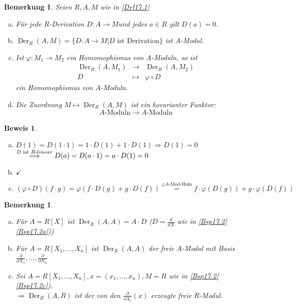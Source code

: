 \documentclass[a4paper,12pt]{report}
\theoremstyle{break}
\newtheorem{Bem}[Def]{Bemerkung}
\theoremstyle{nonumberbreak}
\newtheorem{Bew}{Beweis}
\theoremstyle{nonumberplain}
\DeclareMathOperator{\Der}{Der}
\begin{document}
\begin{Bem}\label{Bem17.3}Seien $R,A,M$ wie in \ref{Def17.1}\begin{enumerate}[a)]
\item
	F\"ur jede $R$-Derivation $D:A\to M$und jedes $a\in R$ gilt $D(a)=0$.
\item
	$\Der_R(A,M)=\{D:A\to M| D \text{ ist Derivation}\}$ ist $A$-Modul.
\item\label{Bem17.3c}
	Ist $\varphi:M_1\to M_2$ ein Homomophismus von $A$-Moduln, so ist \[\begin{array}{rcl}\Der_R(A,M_1)&\to&\Der_R(A,M_2)\\D&\mapsto&\varphi\circ D\end{array}\] ein Homomophismus von $A$-Moduln.
\item
	Die Zuordnung $M\mapsto\Der_R(A,M)$ ist ein kovarianter Funktor:
		\[ \underline{A\text{-Moduln}} \to \underline{A\text{-Moduln}} \]
\end{enumerate}\end{Bem}

\begin{Bew}\begin{enumerate}[a)]
\item
	$D(1)=D(1\cdot1)=1\cdot D(1) + 1\cdot D(1) \Rightarrow D(1)=0$\\
	$\overset{D\text{ ist }R\text-linear}{\Longrightarrow }D(a)=D(a\cdot 1)=a\cdot D(1)=0$
\item
	$\checkmark$
\item
	$(\varphi\circ D)(f\cdot g)=\varphi(f\cdot D(g)+g\cdot D(f))\overset{\varphi A\text{-Mod-Hom}}{=} f\cdot \varphi(D(g))+ g\cdot\varphi(D(f))$
\end{enumerate}\end{Bew}

\begin{Bem}\label{bem17.4}\begin{enumerate}[a)]
\item
	F\"ur $A=R[X]$ ist $\Der_R(A,A)=A\cdot D$ ($D=\frac{d}{dX}$ wie in \ref{Bsp17.2} \ref{Bsp17.2a}))
\item
	F\"ur $A=R[X_1,\ldots ,X_n]$ ist $\Der_R(A,A)$ der freie $A$-Modul mit Basis $\frac{\partial}{\partial X_1},\ldots ,\frac{\partial}{\partial X_n}$
\item\label{bem17.4c}
	Sei $A=R[X_1,\ldots ,X_n], x=(x_1,\ldots ,x_n), M=R$ wie in \ref{Bsp17.2} \ref{Bsp17.2c}).\\
	$\Rightarrow \Der_R(A,R)$ ist der von den $\frac{\partial}{\partial X_i}(x)$ erzeugte freie $R$-Modul.
\end{enumerate}\end{Bem}
\end{document}
